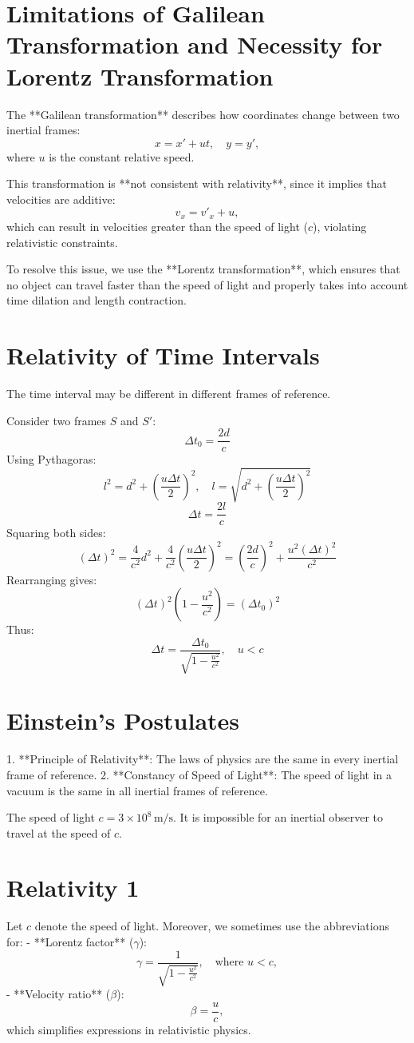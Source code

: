 \documentclass[a4paper,12pt]{article}
\begin{document}
\begin{multicols}{2}
\section*{Limitations of Galilean Transformation and Necessity for Lorentz Transformation}
The **Galilean transformation** describes how coordinates change between two inertial frames:
\[
x = x' + ut, \quad y = y',
\]
where \(u\) is the constant relative speed.

This transformation is **not consistent with relativity**, since it implies that velocities are additive:
\[
v_x = v'_x + u,
\]
which can result in velocities greater than the speed of light (\(c\)), violating relativistic constraints.

To resolve this issue, we use the **Lorentz transformation**, which ensures that no object can travel faster than the speed of light and properly takes into account time dilation and length contraction.

\section*{Relativity of Time Intervals}
The time interval may be different in different frames of reference.

Consider two frames \( S \) and \( S' \):
\[
\Delta t_0 = \frac{2d}{c}
\]
Using Pythagoras:
\[
l^2 = d^2 + \left( \frac{u \Delta t}{2} \right)^2, \quad l = \sqrt{d^2 + \left( \frac{u \Delta t}{2} \right)^2}
\]
\[
\Delta t = \frac{2l}{c}
\]
Squaring both sides:
\[
(\Delta t)^2 = \frac{4}{c^2} d^2 + \frac{4}{c^2} \left( \frac{u \Delta t}{2} \right)^2 = \left( \frac{2d}{c} \right)^2 + \frac{u^2 (\Delta t)^2}{c^2}
\]
Rearranging gives:
\[
(\Delta t)^2 \left( 1 - \frac{u^2}{c^2} \right) = (\Delta t_0)^2
\]
Thus:
\[
\Delta t = \frac{\Delta t_0}{\sqrt{1 - \frac{u^2}{c^2}}}, \quad u < c
\]

\section*{Einstein's Postulates}
1. **Principle of Relativity**: The laws of physics are the same in every inertial frame of reference.
2. **Constancy of Speed of Light**: The speed of light in a vacuum is the same in all inertial frames of reference.

The speed of light \(c = 3 \times 10^8 \, \text{m/s}\). It is impossible for an inertial observer to travel at the speed of \(c\).

\section*{Relativity 1}
Let \( c \) denote the speed of light. Moreover, we sometimes use the abbreviations for:
- **Lorentz factor** (\( \gamma \)):
\[
\gamma = \frac{1}{\sqrt{1 - \frac{u^2}{c^2}}}, \quad \text{where } u < c,
\]
- **Velocity ratio** (\( \beta \)):
\[
\beta = \frac{u}{c}, \tag{1}
\]
which simplifies expressions in relativistic physics.


\end{multicols}
\end{document}
